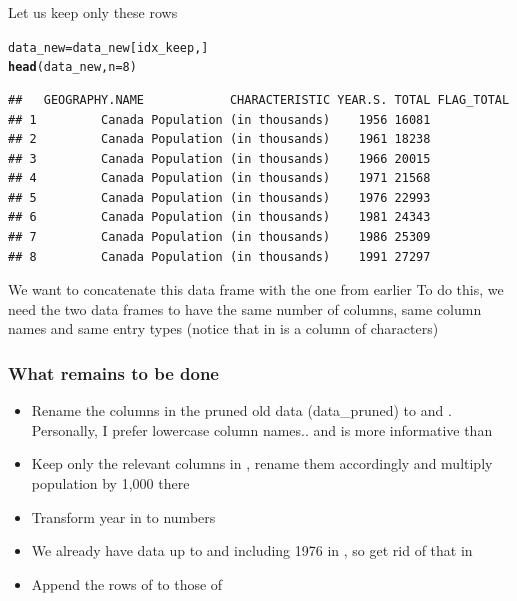 \documentclass[aspectratio=169]{beamer}\usepackage[]{graphicx}\usepackage[]{xcolor}
\makeatletter
\newcommand{\hlnum}[1]{\textcolor[rgb]{0.686,0.059,0.569}{#1}}%
\newcommand{\hldef}[1]{\textcolor[rgb]{0.345,0.345,0.345}{#1}}%
\newcommand{\hlkwb}[1]{\textcolor[rgb]{0.69,0.353,0.396}{#1}}%
\newcommand{\hlkwc}[1]{\textcolor[rgb]{0.333,0.667,0.333}{#1}}%
\newcommand{\hlkwd}[1]{\textcolor[rgb]{0.737,0.353,0.396}{\textbf{#1}}}%
\newenvironment{kframe}{%
 \def\at@end@of@kframe{}%
 \ifinner\ifhmode%
  \def\at@end@of@kframe{\end{minipage}}%
  \begin{minipage}{\columnwidth}%
 \fi\fi%
 \def\FrameCommand##1{\hskip\@totalleftmargin \hskip-\fboxsep
 \colorbox{shadecolor}{##1}\hskip-\fboxsep
     \hskip-\linewidth \hskip-\@totalleftmargin \hskip\columnwidth}%
 \MakeFramed {\advance\hsize-\width
   \@totalleftmargin\z@ \linewidth\hsize
   \@setminipage}}%
 {\par\unskip\endMakeFramed%
 \at@end@of@kframe}
\newenvironment{knitrout}{}{} %
\makeatother
\begin{document}
\begin{frame}[fragile]
Let us keep only these rows
\begin{knitrout}
\color{fgcolor}\begin{kframe}
\begin{alltt}
\hldef{data_new} \hlkwb{=} \hldef{data_new[idx_keep,]}
\hlkwd{head}\hldef{(data_new,} \hlkwc{n} \hldef{=} \hlnum{8}\hldef{)}
\end{alltt}
\begin{verbatim}
##   GEOGRAPHY.NAME            CHARACTERISTIC YEAR.S. TOTAL FLAG_TOTAL
## 1         Canada Population (in thousands)    1956 16081           
## 2         Canada Population (in thousands)    1961 18238           
## 3         Canada Population (in thousands)    1966 20015           
## 4         Canada Population (in thousands)    1971 21568           
## 5         Canada Population (in thousands)    1976 22993           
## 6         Canada Population (in thousands)    1981 24343           
## 7         Canada Population (in thousands)    1986 25309           
## 8         Canada Population (in thousands)    1991 27297
\end{verbatim}
\end{kframe}
\end{knitrout}
\end{frame}


\begin{frame}
We want to concatenate this data frame with the one from earlier
\vfill
To do this, we need the two data frames to have the same number of columns, same column names and same entry types (notice that  in  is a column of characters)
\end{frame}

\begin{frame}\frametitle{What remains to be done}
\begin{itemize}
\item Rename the columns in the pruned old data (data\_pruned) to  and . Personally, I prefer lowercase column names.. and  is more informative than 
\vfill
\item Keep only the relevant columns in , rename them accordingly and multiply population by 1,000 there
\vfill
\item Transform year in  to numbers
\vfill
\item We already have data up to and including 1976 in , so get rid of that in 
\vfill
\item Append the rows of  to those of 
\end{itemize}
\end{frame}
\end{document}
